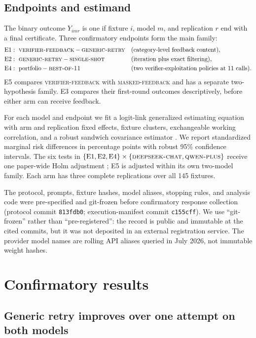 \documentclass[11pt]{scrartcl}
\newcommand{\dscode}{\textsc{deepseek-chat}}
\newcommand{\qwcode}{\textsc{qwen-plus}}
\newcommand{\ssarm}{\textsc{single-shot}}
\newcommand{\grarm}{\textsc{generic-retry}}
\newcommand{\vfarm}{\textsc{verifier-feedback}}
\newcommand{\maskedarm}{\textsc{masked-feedback}}
\newcommand{\bonarm}{\textsc{best-of-11}}
\begin{document}
\subsection{Endpoints and estimand}

The binary outcome $Y_{imr}$ is one if fixture $i$, model $m$, and replication
$r$ end with a final certificate.  Three confirmatory endpoints form the main
family:
\begin{align*}
  \mathrm{E1}&:\ \vfarm-\grarm &&\text{(category-level feedback content)},\\
  \mathrm{E2}&:\ \grarm-\ssarm &&\text{(iteration plus exact filtering)},\\
  \mathrm{E4}&:\ \text{portfolio}-\bonarm
    &&\text{(two verifier-exploitation policies at 11 calls)}.
\end{align*}
E5 compares \vfarm{} with \maskedarm{} and has a separate two-hypothesis
family.  E3 compares their first-round outcomes descriptively, before either arm
can receive feedback.

For each model and endpoint we fit a logit-link generalized estimating equation
with arm and replication fixed effects, fixture clusters, exchangeable working
correlation, and a robust sandwich covariance estimator
\cite{Liang:1986gee}.  We report standardized marginal risk differences in
percentage points with robust 95\% confidence intervals.  The six tests in
$\{\mathrm{E1},\mathrm{E2},\mathrm{E4}\}\times\{\dscode,\qwcode\}$ receive
one paper-wide Holm adjustment \cite{Holm:1979multiple}; E5 is adjusted within
its own two-model family.  Each arm has three complete replications over all 145
fixtures.

The protocol, prompts, fixture hashes, model aliases, stopping rules, and
analysis code were pre-specified and git-frozen before confirmatory response
collection (protocol commit \texttt{813fdb0}; execution-manifest commit
\texttt{c155cff}).  We use ``git-frozen'' rather than ``pre-registered'': the
record is public and immutable at the cited commits, but it was not deposited in
an external registration service.  The provider model names are rolling API
aliases queried in July 2026, not immutable weight hashes.

\section{Confirmatory results}
\label{sec:results}

\subsection{Generic retry improves over one attempt on both models}
\end{document}
